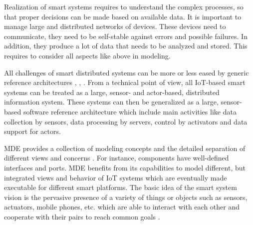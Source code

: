 Realization of smart systems requires to understand the complex processes, so that proper decisions can be made based on available data. It is important to manage large and distributed networks of devices. These devices need to communicate, they need to be self-stable against errors and possible failures. In addition, they produce a lot of data that needs to be analyzed and stored. This requires to consider all aspects like above in modeling.

All challenges of smart distributed systems can be more or less eased by generic reference architectures \cite{Fleurey+2011}, \cite{Gubbi+2013}, \cite{KateuleWinter2018}. From a technical point of view, all IoT-based smart systems can be treated as a large, sensor- and actor-based, distributed information system. These systems can then be generalized as a large, sensor-based software reference architecture \cite{KateuleWinter2018} which include main activities like data collection by sensors, data processing by servers, control by activators and data support for actors.

MDE provides a collection of modeling concepts and the detailed separation of different views and concerns \cite{KateuleWinter2018}. For instance, components have well-defined interfaces and ports. MDE benefits from its capabilities to model different, but integrated views and behavior of IoT systems which are eventually made executable for different smart platforms. The basic idea of the smart system vision is the pervasive presence of a variety of things or objects such as sensors, actuators, mobile phones, etc. which are able to interact with each other and cooperate with their pairs to reach common goals \cite{Atzori+2010} \cite{WeberRomana2010}.